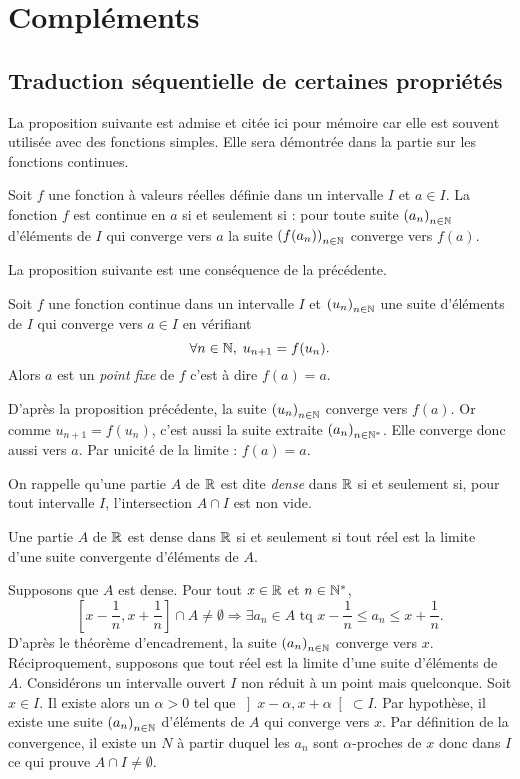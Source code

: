 \section{Compléments}
\subsection{Traduction séquentielle de certaines propriétés}
La proposition suivante est admise et citée ici pour mémoire car elle est souvent utilisée avec des fonctions simples. Elle sera démontrée dans la partie sur les fonctions continues.
\begin{prop}
 Soit $f$ une fonction à valeurs réelles définie dans un intervalle $I$ et $a\in I$. La fonction $f$ est continue en $a$ si et seulement si : pour toute suite $\left( a_n \right)_{n \in \mathbb{N}}$ d'éléments de $I$ qui converge vers $a$ la suite $\left( f(a_n) \right)_{n \in \mathbb{N}}$ converge vers $f(a)$.
\end{prop}
La proposition suivante est une conséquence de la précédente.
\begin{prop}
 Soit $f$ une fonction continue dans un intervalle $I$ et $\left( u_n \right)_{n \in \mathbb{N}}$ une suite d'éléments de $I$ qui converge vers $a\in I$ en vérifiant 
\[
 \forall n \in \mathbb{N}, \; u_{n+1} = f(u_n).
\]
Alors $a$ est un \emph{point fixe} de $f$ c'est à dire $f(a) = a$. 
\end{prop}
\begin{demo}
 D'après la proposition précédente, la suite $\left( u_n \right)_{n \in \mathbb{N}}$ converge vers $f(a)$. Or comme $u_{n+1} = f(u_n)$, c'est aussi la suite extraite $\left( a_n \right)_{n \in \mathbb{N}^*}$. Elle converge donc aussi vers $a$. Par unicité de la limite : $f(a)=a$.
\end{demo}
On rappelle qu'une partie $A$ de $\mathbb{R}$ est dite \emph{dense} dans $\mathbb{R}$ si et seulement si, pour tout intervalle $I$, l'intersection $A\cap I$ est non vide. 
\begin{propn}
  Une partie $A$ de $\mathbb{R}$ est dense dans $\mathbb{R}$ si et seulement si tout réel est la limite d'une suite convergente d'éléments de $A$. 
\end{propn}
\begin{demo}
Supposons que $A$ est dense. Pour tout $x\in \mathbb{R}$ et $n\in \mathbb{N}^*$,
\[
 \left[ x-\frac{1}{n} , x + \frac{1}{n}\right] \cap A \neq \emptyset \Rightarrow \exists a_n \in A \text{ tq } x-\frac{1}{n} \leq a_n \leq x + \frac{1}{n}.
\]
D'après le théorème d'encadrement, la suite $\left( a_n \right)_{n \in \mathbb{N}}$ converge vers $x$.\newline
Réciproquement, supposons que tout réel est la limite d'une suite d'éléments de $A$. Considérons un intervalle ouvert $I$ non réduit à un point mais quelconque. Soit $x \in I$. Il existe alors un $\alpha >0$ tel que $\left] x - \alpha , x + \alpha \right[ \subset I$. Par hypothèse, il existe une suite $\left( a_n \right)_{n \in \mathbb{N}}$ d'éléments de $A$ qui converge vers $x$. Par définition de la convergence, il existe un $N$ à partir duquel les $a_n$ sont $\alpha$-proches de $x$ donc dans $I$ ce qui prouve $A\cap I \neq \emptyset$.  
\end{demo}

